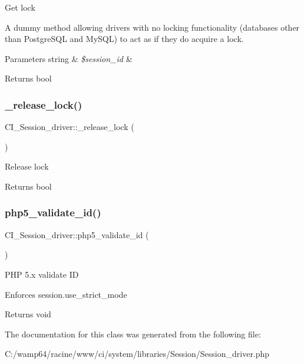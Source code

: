 Get lock

A dummy method allowing drivers with no locking functionality (databases other than Postgre\+S\+QL and My\+S\+QL) to act as if they do acquire a lock.


\begin{DoxyParams}[1]{Parameters}
string & {\em \$session\+\_\+id} & \\
\hline
\end{DoxyParams}
\begin{DoxyReturn}{Returns}
bool 
\end{DoxyReturn}
\mbox{\label{class_c_i___session__driver_a411934e8312e6c66f0c6a398c8dfe7b4}} 
\subsubsection{\texorpdfstring{\+\_\+release\+\_\+lock()}{\_release\_lock()}}
{\footnotesize\ttfamily C\+I\+\_\+\+Session\+\_\+driver\+::\+\_\+release\+\_\+lock (\begin{DoxyParamCaption}{ }\end{DoxyParamCaption})\hspace{0.3cm}{\ttfamily [protected]}}

Release lock

\begin{DoxyReturn}{Returns}
bool 
\end{DoxyReturn}
\mbox{\label{class_c_i___session__driver_a718760da63eb472c10d6c2a48fe39cd1}} 
\subsubsection{\texorpdfstring{php5\+\_\+validate\+\_\+id()}{php5\_validate\_id()}}
{\footnotesize\ttfamily C\+I\+\_\+\+Session\+\_\+driver\+::php5\+\_\+validate\+\_\+id (\begin{DoxyParamCaption}{ }\end{DoxyParamCaption})}

P\+HP 5.\+x validate ID

Enforces session.\+use\+\_\+strict\+\_\+mode

\begin{DoxyReturn}{Returns}
void 
\end{DoxyReturn}


The documentation for this class was generated from the following file\+:\begin{DoxyCompactItemize}
\item 
C\+:/wamp64/racine/www/ci/system/libraries/\+Session/Session\+\_\+driver.\+php\end{DoxyCompactItemize}
